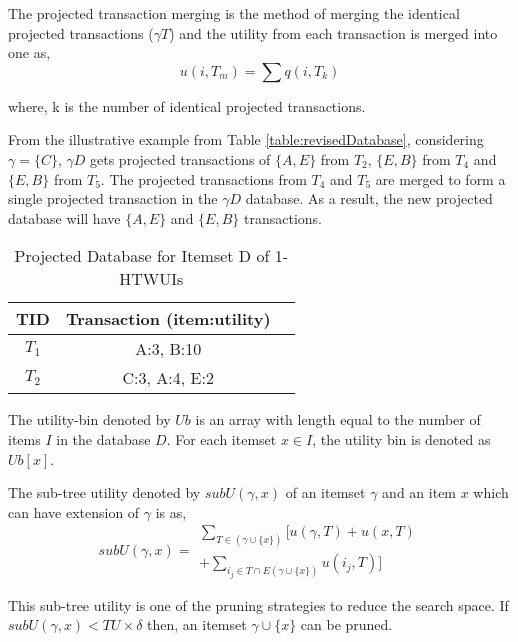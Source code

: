 \documentclass[11pt,openright]{report}
\begin{document}
\begin{definition}
		The projected transaction merging is the method of merging the identical projected transactions (${\gamma}T$) and the utility from each transaction is merged into one as,
	\begin{equation}
	u(i,T_m) = \sum q(i,T_k)
	\end{equation}
	
	where, k is the number of identical projected transactions.
\end{definition}
From the illustrative example from Table \ref{table:revisedDatabase}, considering $\gamma = \{C\}$,  ${\gamma}D$ gets projected transactions of $\{A,E\}$ from $T_2$, $\{E,B\}$ from $T_4$ and $\{E,B\}$ from $T_5$. The projected transactions from $T_4$ and $T_5$ are merged to form a single projected transaction in the ${\gamma}D$ database. As a result, the new projected database will have $\{A,E\}$ and $\{E,B\}$ transactions.

\begin{table}
	\renewcommand{\arraystretch}{1.3}
	\caption{Projected Database for Itemset D of 1-HTWUIs}
	\label{table:projectedtransactionDB}
	\centering
	\begin{tabular}{|c||c||c|}
		\hline
		\bfseries TID & \bfseries Transaction (item:utility)\\
		\hline\hline
		$T_1$ & A:3, B:10\\ \hline
		$T_2$ & C:3, A:4, E:2\\ \hline
	\end{tabular}
\end{table}

\begin{definition}
	The utility-bin denoted by $Ub$ is an array with length equal to the number of items $I$ in the database $D$. For each itemset $x \in I$, the utility bin is denoted as $Ub[x]$.
\end{definition}

\begin{definition}
	The sub-tree utility denoted by $subU(\gamma, x)$ of an itemset $\gamma$ and an item $x$ which can have extension of $\gamma$ is as,
	\begin{equation}
	subU(\gamma, x) = \begin{matrix}
	\sum_{T \in (\gamma \cup \{x\})} [u(\gamma,T) + u(x,T)
	\\ 
	+ \sum_{i_j \in T \cap E(\gamma \cup \{x\})}u(i_j,T)]
	\end{matrix}
	\label{eq:sub_utility}
	\end{equation}
\end{definition}
This sub-tree utility is one of the pruning strategies to reduce the search space. If $subU(\gamma, x) < TU \times \delta$ then, an itemset $\gamma \cup \{x\}$ can be pruned.
\end{document}
